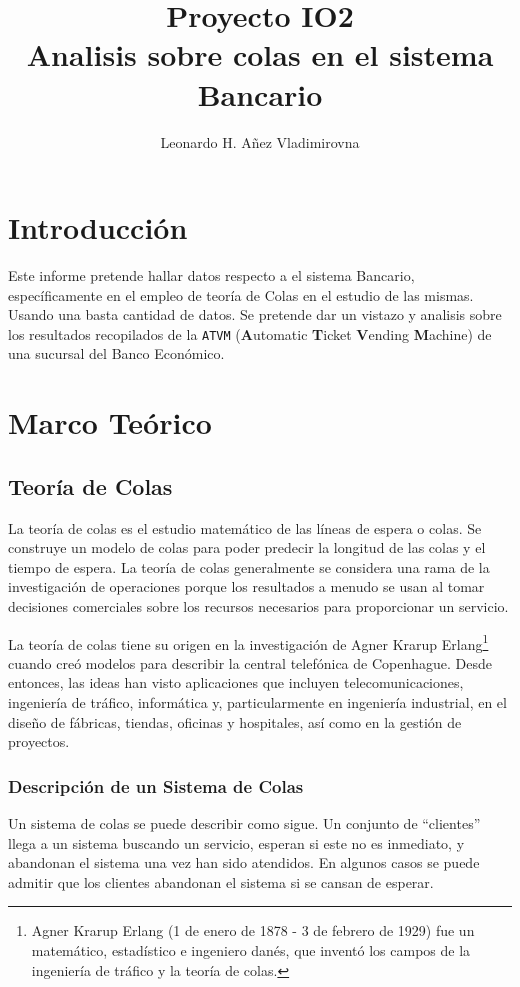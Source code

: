 \documentclass[10pt,letterpaper]{report}
\author{Leonardo H. Añez Vladimirovna}
\title{Proyecto IO2\\Analisis sobre colas en el sistema Bancario}
\begin{document}
\maketitle
\section*{Introducción}
Este informe pretende hallar datos respecto a el sistema Bancario, específicamente en el empleo de teoría de Colas en el estudio de las mismas. Usando una basta cantidad de datos. Se pretende dar un vistazo y analisis sobre los resultados recopilados de la \texttt{ATVM} (\textbf{A}utomatic \textbf{T}icket \textbf{V}ending \textbf{M}achine) de una sucursal del Banco Económico.
\section*{Marco Teórico}
\subsection*{Teoría de Colas}
La teoría de colas es el estudio matemático de las líneas de espera o colas. Se construye un modelo de colas para poder predecir la longitud de las colas y el tiempo de espera. La teoría de colas generalmente se considera una rama de la investigación de operaciones porque los resultados a menudo se usan al tomar decisiones comerciales sobre los recursos necesarios para proporcionar un servicio.

La teoría de colas tiene su origen en la investigación de Agner Krarup Erlang\footnote{Agner Krarup Erlang (1 de enero de 1878 - 3 de febrero de 1929) fue un matemático, estadístico e ingeniero danés, que inventó los campos de la ingeniería de tráfico y la teoría de colas.} cuando creó modelos para describir la central telefónica de Copenhague. Desde entonces, las ideas han visto aplicaciones que incluyen telecomunicaciones, ingeniería de tráfico, informática y, particularmente en ingeniería industrial, en el diseño de fábricas, tiendas, oficinas y hospitales, así como en la gestión de proyectos.
\subsubsection*{Descripción de un Sistema de Colas}
Un sistema de colas se puede describir como sigue. Un conjunto de ``clientes'' llega  a  un  sistema buscando  un  servicio,  esperan  si  este  no  es  inmediato,  y  abandonan  el  sistema  una  vez  han  sido  atendidos.  En  algunos  casos  se  puede  admitir que los clientes abandonan el sistema si se cansan de esperar.
\end{document}
